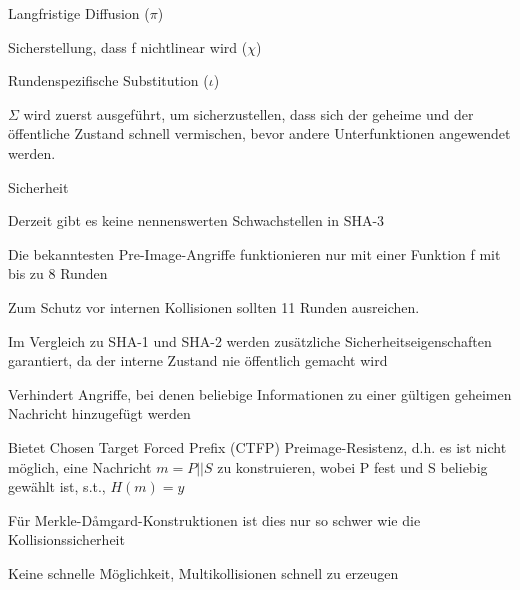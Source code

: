 \documentclass[a4paper]{article}
\begin{document}
\begin{multicols}{3}
\begin{itemize*}
\begin{itemize*}
\begin{itemize*}
                        \item Langfristige Diffusion ($\pi$)
                        \item Sicherstellung, dass f nichtlinear wird ($\chi$)
                        \item Rundenspezifische Substitution ($\iota$)
                  \end{itemize*}
            \end{itemize*}
            \item $\Sigma$ wird zuerst ausgeführt, um sicherzustellen, dass sich der geheime und der öffentliche Zustand schnell vermischen, bevor andere Unterfunktionen angewendet werden.
            \item Sicherheit
            \begin{itemize*}
                  \item Derzeit gibt es keine nennenswerten Schwachstellen in SHA-3
                  \begin{itemize*}
                        \item Die bekanntesten Pre-Image-Angriffe funktionieren nur mit einer Funktion f mit bis zu 8 Runden
                        \item Zum Schutz vor internen Kollisionen sollten 11 Runden ausreichen.
                  \end{itemize*}
                  \item Im Vergleich zu SHA-1 und SHA-2 werden zusätzliche Sicherheitseigenschaften garantiert, da der interne Zustand nie öffentlich gemacht wird
                  \begin{itemize*}
                        \item Verhindert Angriffe, bei denen beliebige Informationen zu einer gültigen geheimen Nachricht hinzugefügt werden
                        \item Bietet Chosen Target Forced Prefix (CTFP) Preimage-Resistenz, d.h. es ist nicht möglich, eine Nachricht $m=P|| S$ zu konstruieren, wobei P fest und S beliebig gewählt ist, s.t., $H(m)=y$
                        \item Für Merkle-Dåmgard-Konstruktionen ist dies nur so schwer wie die Kollisionssicherheit
                        \item Keine schnelle Möglichkeit, Multikollisionen schnell zu erzeugen
                  \end{itemize*}
            \end{itemize*}
      \end{itemize*}


\end{multicols}
\end{document}
